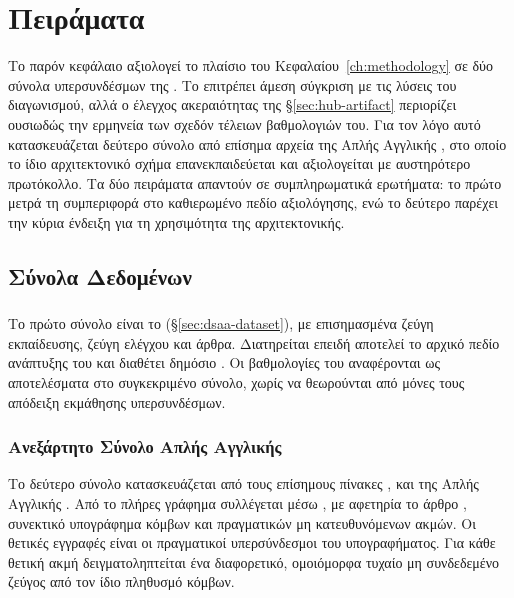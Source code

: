 

\chapter{Πειράματα}
\label{ch:experiments}

Το παρόν κεφάλαιο αξιολογεί το πλαίσιο  του
Κεφαλαίου~\ref{ch:methodology} σε δύο σύνολα υπερσυνδέσμων της .
Το  επιτρέπει άμεση σύγκριση με τις λύσεις του διαγωνισμού, αλλά ο
έλεγχος ακεραιότητας της \S\ref{sec:hub-artifact} περιορίζει ουσιωδώς την
ερμηνεία των σχεδόν τέλειων βαθμολογιών του.
Για τον λόγο αυτό κατασκευάζεται
δεύτερο σύνολο από επίσημα αρχεία της Απλής Αγγλικής , στο οποίο
το ίδιο αρχιτεκτονικό σχήμα επανεκπαιδεύεται και αξιολογείται με αυστηρότερο
πρωτόκολλο.
Τα δύο πειράματα απαντούν σε συμπληρωματικά ερωτήματα: το πρώτο
μετρά τη συμπεριφορά στο καθιερωμένο πεδίο αξιολόγησης, ενώ το δεύτερο παρέχει
την κύρια ένδειξη για τη χρησιμότητα της αρχιτεκτονικής.


\section{Σύνολα Δεδομένων}
\label{sec:datasets}

\subsection{}
\label{subsec:dsaa-dataset-eval}

Το πρώτο σύνολο είναι το 
(\S\ref{sec:dsaa-dataset}), με \TrainPairs{} επισημασμένα ζεύγη εκπαίδευσης,
\TestPairs{} ζεύγη ελέγχου και \GraphNodesTotal{} άρθρα.
Διατηρείται επειδή
αποτελεί το αρχικό πεδίο ανάπτυξης του  και διαθέτει δημόσιο
.
Οι βαθμολογίες του αναφέρονται ως αποτελέσματα στο συγκεκριμένο
σύνολο, χωρίς να θεωρούνται από μόνες τους απόδειξη εκμάθησης υπερσυνδέσμων.

\subsection{Ανεξάρτητο Σύνολο Απλής Αγγλικής }
\label{subsec:wiki-fresh-construction}

Το δεύτερο σύνολο κατασκευάζεται από τους επίσημους πίνακες \texttt{},
\texttt{} και \texttt{} της Απλής Αγγλικής
.
Από το πλήρες γράφημα συλλέγεται μέσω , με αφετηρία το
άρθρο , συνεκτικό υπογράφημα \WfCrawlNodes{} κόμβων και
\WfCrawlEdges{} πραγματικών μη κατευθυνόμενων ακμών.
Οι θετικές εγγραφές είναι
οι πραγματικοί υπερσύνδεσμοι του υπογραφήματος.
Για κάθε θετική ακμή
δειγματοληπτείται ένα διαφορετικό, ομοιόμορφα τυχαίο μη συνδεδεμένο ζεύγος από
τον ίδιο πληθυσμό κόμβων.

